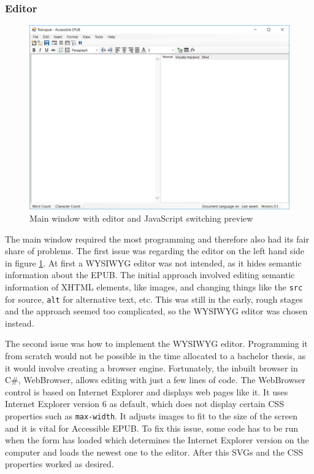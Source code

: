 \subsubsection{Editor}

\begin{figure}
	\includegraphics[width=\linewidth]{figures/formJs.png}	
	\caption{Main window with editor and JavaScript switching preview}
	\label{fig:formJs}
\end{figure}

The main window required the most programming and therefore also had its fair share of problems. The first issue was regarding the editor on the left hand side in figure \ref{fig:formJs}. At first a WYSIWYG editor was not intended, as it hides semantic information about the EPUB. The initial approach involved editing semantic information of XHTML elements, like images, and changing things like the \lstinline|src| for source, \lstinline|alt| for alternative text, etc. This was still in the early, rough stages and the approach seemed too complicated, so the WYSIWYG editor was chosen instead. 

The second issue was how to implement the WYSIWYG editor. Programming it from scratch would not be possible in the time allocated to a bachelor thesis, as it would involve creating a browser engine. Fortunately, the inbuilt browser in C\#, WebBrowser, allows editing with just a few lines of code. The WebBrowser control is based on Internet Explorer and displays web pages like it. It uses Internet Explorer version 6 as default, which does not display certain CSS properties such as \lstinline|max-width|. It adjusts images to fit to the size of the screen and it is vital for Accessible EPUB. To fix this issue, some code has to be run when the form has loaded which determines the Internet Explorer version on the computer and loads the newest one to the editor. After this SVGs and the CSS properties worked as desired. 

